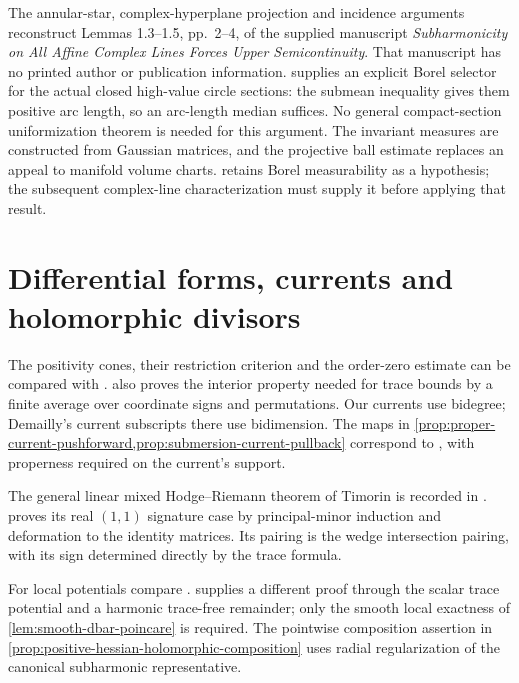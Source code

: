 The annular-star, complex-hyperplane projection and incidence arguments reconstruct Lemmas 1.3--1.5, pp.~2--4, of the supplied manuscript \emph{Subharmonicity on All Affine Complex Lines Forces Upper Semicontinuity}. That manuscript has no printed author or publication information.  supplies an explicit Borel selector for the actual closed high-value circle sections: the submean inequality gives them positive arc length, so an arc-length median suffices. No general compact-section uniformization theorem is needed for this argument. The invariant measures are constructed from Gaussian matrices, and the projective ball estimate replaces an appeal to manifold volume charts.  retains Borel measurability as a hypothesis; the subsequent complex-line characterization must supply it before applying that result.

\section{Differential forms, currents and holomorphic divisors}
\label{sec:history-complex-currents}
The positivity cones, their restriction criterion and the order-zero estimate can be compared with \cite[Chapter III, Section 1.A--B, pp.~129--134, especially (1.4), (1.6) and (1.14)]{DemBook}.  also proves the interior property needed for trace bounds by a finite average over coordinate signs and permutations. Our currents use bidegree; Demailly's current subscripts there use bidimension. The maps in \cref{prop:proper-current-pushforward,prop:submersion-current-pullback} correspond to \cite[Chapter III, (1.17), p.~134]{DemBook}, with properness required on the current's support.

The general linear mixed Hodge--Riemann theorem of Timorin is recorded in \cite[Proposition 2.1, p.~4]{DN2005mixedv2}.  proves its real $(1,1)$ signature case by principal-minor induction and deformation to the identity matrices. Its pairing is the wedge intersection pairing, with its sign determined directly by the trace formula.


For local potentials compare \cite[Chapter III, Section 1.18 and (1.19), p.~135]{DemBook}.  supplies a different proof through the scalar trace potential and a harmonic trace-free remainder; only the smooth local exactness of \cref{lem:smooth-dbar-poincare} is required. The pointwise composition assertion in \cref{prop:positive-hessian-holomorphic-composition} uses radial regularization of the canonical subharmonic representative.

